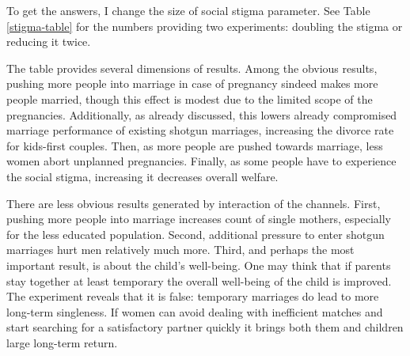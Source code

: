 \documentclass[12pt,letter]{article}
\begin{document}
To get the answers, I change the size of social stigma parameter. See Table \ref{stigma-table} for the numbers providing two experiments: doubling the stigma or reducing it twice. 

The table provides several dimensions of results. Among the obvious results, pushing more people into marriage in case of pregnancy sindeed makes more people married, though this effect is modest due to the limited scope of the pregnancies. Additionally, as already discussed, this lowers already compromised marriage performance of existing shotgun marriages, increasing the divorce rate for kids-first couples. Then, as more people are pushed towards marriage, less women abort unplanned pregnancies. Finally, as some people have to experience the social stigma, increasing it decreases overall welfare. 

There are less obvious results generated by interaction of the channels. First, pushing more people into marriage increases count of single mothers, especially for the less educated population. Second, additional pressure to enter shotgun marriages hurt men relatively much more. Third, and perhaps the most important result, is about the child's well-being. One may think that if parents stay together at least temporary the overall well-being of the child is improved.  The experiment reveals that it is false: temporary marriages do lead to more long-term singleness. If women can avoid dealing with inefficient matches and start searching for a satisfactory partner quickly it brings both them and children large long-term return.
\end{document}
